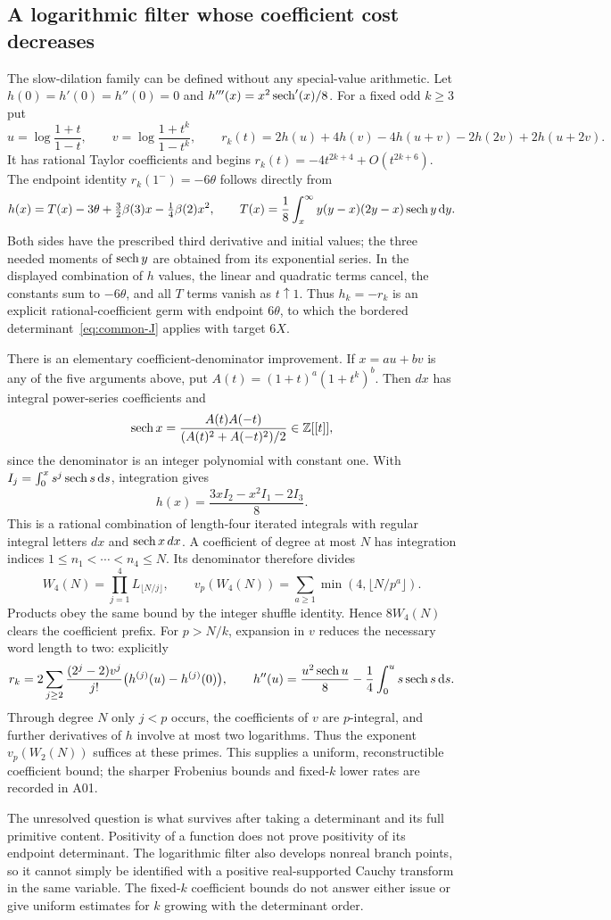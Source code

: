 \subsection{A logarithmic filter whose coefficient cost decreases}
The slow-dilation family can be defined without any special-value
arithmetic. Let $h(0)=h'(0)=h''(0)=0$ and
$h'''(x)=x^2\operatorname{sech}'(x)/8$. For a fixed odd $k\geq3$ put
\[
 u=\log\frac{1+t}{1-t},\qquad v=\log\frac{1+t^k}{1-t^k},\qquad
 r_k(t)=2h(u)+4h(v)-4h(u+v)-2h(2v)+2h(u+2v).
\]
It has rational Taylor coefficients and begins
$r_k(t)=-4t^{2k+4}+O(t^{2k+6})$.
The endpoint identity $r_k(1^-)=-6\theta$ follows directly from
\[
 h(x)=T(x)-3\theta+\tfrac32\beta(3)x-\tfrac14\beta(2)x^2,
 \qquad
 T(x)=\frac18\int_x^\infty y(y-x)(2y-x)\operatorname{sech} y\,\mathrm d y.
\]
Both sides have the prescribed third derivative and initial values;
the three needed moments of $\operatorname{sech} y$ are obtained from its exponential
series. In the displayed combination of $h$ values, the linear and
quadratic terms cancel, the constants sum to $-6\theta$, and all
$T$ terms vanish as $t\uparrow1$. Thus $h_k=-r_k$ is an explicit
rational-coefficient germ with endpoint $6\theta$, to which the
bordered determinant~\eqref{eq:common-J} applies with target $6X$.

There is an elementary coefficient-denominator improvement. If
$x=au+bv$ is any of the five arguments above, put
$A(t)=(1+t)^a(1+t^k)^b$. Then $dx$ has integral power-series
coefficients and
\[
 \operatorname{sech} x=\frac{A(t)A(-t)}{(A(t)^2+A(-t)^2)/2}\in\mathbb Z[[t]],
\]
since the denominator is an integer polynomial with constant one.
With $I_j=\int_0^x s^j\operatorname{sech} s\,\mathrm d s$, integration gives
\[
 h(x)=\frac{3xI_2-x^2I_1-2I_3}{8}.
\]
This is a rational combination of length-four iterated integrals with
regular integral letters $dx$ and $\operatorname{sech} x\,dx$.
A coefficient of degree at most $N$ has integration indices
$1\leq n_1<\cdots<n_4\leq N$. Its denominator therefore divides
\[
 W_4(N)=\prod_{j=1}^4L_{\lfloor N/j\rfloor},\qquad
 v_p(W_4(N))=\sum_{a\geq1}\min(4,\lfloor N/p^a\rfloor).
\]
Products obey the same bound by the integer shuffle identity.
Hence $8W_4(N)$ clears the coefficient prefix. For $p>N/k$, expansion
in $v$ reduces the necessary word length to two: explicitly
\[
 r_k=2\sum_{j\geq2}\frac{(2^j-2)v^j}{j!}
                       \bigl(h^{(j)}(u)-h^{(j)}(0)\bigr),\qquad
 h''(u)=\frac{u^2\operatorname{sech} u}{8}-\frac14\int_0^u s\operatorname{sech} s\,\mathrm d s.
\]
Through degree $N$ only $j<p$ occurs, the coefficients of $v$ are
$p$-integral, and further derivatives of $h$ involve at most two
logarithms. Thus the exponent $v_p(W_2(N))$ suffices at these primes.
This supplies a uniform, reconstructible coefficient bound; the sharper
Frobenius bounds and fixed-$k$ lower rates are recorded in A01.

The unresolved question is what survives after taking a determinant
and its full primitive content. Positivity of a function does not
prove positivity of its endpoint determinant. The logarithmic filter
also develops nonreal branch points, so it cannot simply be identified
with a positive real-supported Cauchy transform in the same variable.
The fixed-$k$ coefficient bounds do not answer either issue or give
uniform estimates for $k$ growing with the determinant order.
